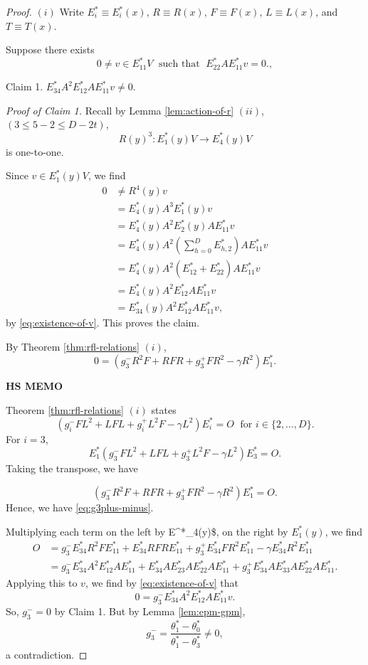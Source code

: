 \documentclass[
]{book}
\theoremstyle{definition}
\theoremstyle{definition}
\theoremstyle{definition}
\theoremstyle{definition}
\theoremstyle{remark}
\begin{document}
\begin{proof}
\leavevmode

\((i)\) Write \(E^*_i\equiv E^*_i(x)\), \(R \equiv R(x)\), \(F \equiv F(x)\), \(L \equiv L(x)\), and \(T \equiv T(x)\).

Suppose there exists
\begin{equation}
0\neq v\in E^*_{11}V \; \text{ such that }\; E^*_{22}AE^*_{11}v = 0. \label{eq:existence-of-v},
\end{equation}

Claim 1. \(E^*_{34}A^2E^*_{12}AE^*_{11}v \neq 0\).

\emph{Proof of Claim 1.}
Recall by Lemma \ref{lem:action-of-r} \((ii)\), \((3 \leq 5-2 \leq D-2t)\),
\[R(y)^3: E^*_1(y)V \to E^*_4(y)V\]
is one-to-one.

Since \(v\in E^*_1(y)V\), we find
\begin{align}
0 & \neq R^4(y)v\\
& = E^*_4(y)A^3E^*_1(y)v\\
& = E^*_4(y)A^2E^*_2(y)AE^*_{11}v\\
& = E^*_4(y)A^2\left(\sum_{h=0}^D E^*_{h,2}\right)AE^*_{11}v\\
& = E^*_4(y)A^2(E^*_{12} + E^*_{22})AE^*_{11}v\\
& = E^*_4(y)A^2E^*_{12}AE^*_{11}v \\
& = E^*_{34}(y)A^2E^*_{12}AE^*_{11}v,
\end{align}
by \eqref{eq:existence-of-v}.
This proves the claim.

By Theorem \ref{thm:rfl-relations} \((i)\),
\begin{equation}
0 = (g_3^-R^2F + RFR + g^+_3FR^2 - \gamma R^2)E^*_1.  \label{eq:g3plus-minus}
\end{equation}

\textbf{HS MEMO}

Theorem \ref{thm:rfl-relations} \((i)\) states
\[(g_i^-FL^2 + LFL + g^+_iL^2F - \gamma L^2)E^*_i = O \;\text{ for }i\in \{2, \ldots, D\}.\]
For \(i = 3\),
\[E^*_1(g^-_3 FL^2 + LFL + g^+_3 L^2F - \gamma L^2)E^*_3 = O.\]
Taking the transpose, we have

\[(g^{-}_3 R^2 F + RFR + g^{+}_3 FR^2 - \gamma R^2) E^*_1 = O.\]
Hence, we have \eqref{eq:g3plus-minus}.

Multiplying each term on the left by E\^{}*\_4(y)\$, on the right by \(E^*_1(y)\), we find
\begin{align}
O & = g^-_3E^*_{34}R^2FE^*_{11} + E^*_{34}RFRE^*_{11} + g^+_3E^*_{34}FR^2E^*_{11}-\gamma E^*_{34}R^2E^*_{11}\\
& = g^-_3E^*_{34}A^2E^*_{12}AE^*_{11} + E^*_{34}AE^*_{23}AE^*_{22}AE^*_{11} + g^+_3E^*_{34}AE^*_{33}AE^*_{22}AE^*_{11}. \label{eq:g3plus-minus-zero}
\end{align}
Applying this to \(v\), we find by \eqref{eq:existence-of-v} that
\[0 = g^-_3E^*_{34}A^2E^*_{12}AE^*_{11}v.\]
So, \(g^-_3 = 0\) by Claim 1. But by Lemma \ref{lem:epm-gpm},
\[g^-_3 = \frac{\theta^*_1-\theta^*_0}{\theta^*_1-\theta^*_3} \neq 0,\]
a contradiction.

\end{proof}
\end{document}

